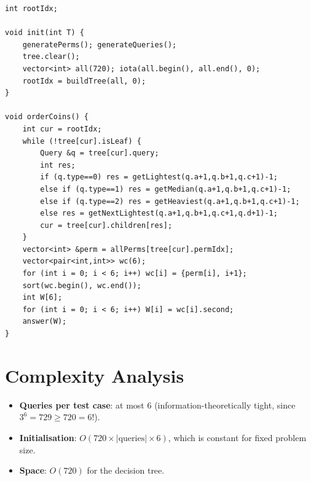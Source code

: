 \documentclass[11pt,a4paper]{article}
\begin{document}
\begin{lstlisting}
int rootIdx;

void init(int T) {
    generatePerms(); generateQueries();
    tree.clear();
    vector<int> all(720); iota(all.begin(), all.end(), 0);
    rootIdx = buildTree(all, 0);
}

void orderCoins() {
    int cur = rootIdx;
    while (!tree[cur].isLeaf) {
        Query &q = tree[cur].query;
        int res;
        if (q.type==0) res = getLightest(q.a+1,q.b+1,q.c+1)-1;
        else if (q.type==1) res = getMedian(q.a+1,q.b+1,q.c+1)-1;
        else if (q.type==2) res = getHeaviest(q.a+1,q.b+1,q.c+1)-1;
        else res = getNextLightest(q.a+1,q.b+1,q.c+1,q.d+1)-1;
        cur = tree[cur].children[res];
    }
    vector<int> &perm = allPerms[tree[cur].permIdx];
    vector<pair<int,int>> wc(6);
    for (int i = 0; i < 6; i++) wc[i] = {perm[i], i+1};
    sort(wc.begin(), wc.end());
    int W[6];
    for (int i = 0; i < 6; i++) W[i] = wc[i].second;
    answer(W);
}
\end{lstlisting}

\section{Complexity Analysis}

\begin{itemize}
  \item \textbf{Queries per test case}: at most 6 (information-theoretically tight, since $3^6 = 729 \ge 720 = 6!$).
  \item \textbf{Initialisation}: $O(720 \times |\text{queries}| \times 6)$, which is constant for fixed problem size.
  \item \textbf{Space}: $O(720)$ for the decision tree.
\end{itemize}
\end{document}
